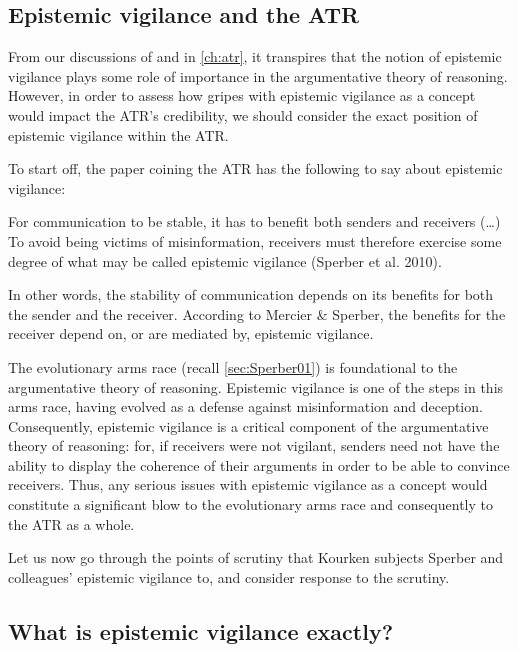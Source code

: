 \subsection{Epistemic vigilance and the ATR}
\label{sec:epi-vigil-atr}

From our discussions of \citet{Sperber10} and \citet{MS11} in \cref{ch:atr}, it transpires that the notion of epistemic vigilance plays some role of importance in the argumentative theory of reasoning. However, in order to assess how gripes with epistemic vigilance as a concept would impact the ATR's credibility, we should consider the exact position of epistemic vigilance within the ATR.

To start off, the paper coining the ATR has the following to say about epistemic vigilance:

\begin{quoting}
    For communication to be stable, it has to benefit both senders and receivers (\ldots) To avoid being victims of misinformation, receivers must therefore exercise some degree of what may be called epistemic vigilance (Sperber et al. 2010).
    \hfill \citep[p.~60]{MS11}
\end{quoting}
In other words, the stability of communication depends on its benefits for both the sender and the receiver. According to Mercier \& Sperber, the benefits for the receiver depend on, or are mediated by, epistemic vigilance.

The evolutionary arms race (recall \cref{sec:Sperber01}) is foundational to the argumentative theory of reasoning. Epistemic vigilance is one of the steps in this arms race, having evolved as a defense against misinformation and deception. Consequently, epistemic vigilance is a critical component of the argumentative theory of reasoning: for, if receivers were not vigilant, senders need not have the ability to display the coherence of their arguments in order to be able to convince receivers. Thus, any serious issues with epistemic vigilance as a concept would constitute a significant blow to the evolutionary arms race and consequently to the ATR as a whole.

Let us now go through the points of scrutiny that Kourken \citet{Michaelian13} subjects Sperber and colleagues' epistemic vigilance to, and consider  response to the scrutiny.

\subsection{What is epistemic vigilance exactly?}
\label{sec:EV-def}

